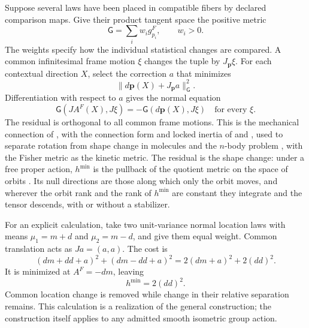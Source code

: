 Suppose several laws have been placed in compatible fibers by declared comparison maps. Give their product tangent space the positive metric
\begin{equation}
\mathsf G=\sum_iw_i g^F_{p_i},
\qquad w_i>0.
\end{equation}
The weights specify how the individual statistical changes are compared. A common infinitesimal frame motion $\xi$ changes the tuple by $J_{\boldsymbol p}\xi$. For each contextual direction $X$, select the correction $a$ that minimizes
\begin{equation}
\|d\boldsymbol p(X)+J_{\boldsymbol p}a\|_{\mathsf G}^2.
\end{equation}
Differentiation with respect to $a$ gives the normal equation
\begin{equation}
\mathsf G(JA^F(X),J\xi)
=-\mathsf G(d\boldsymbol p(X),J\xi)
\quad\text{for every }\xi.
\end{equation}
The residual is orthogonal to all common frame motions. This is the mechanical connection of \citet{Smale1970}, with the connection form and locked inertia of \citet{Kummer1981} and \citet{MarsdenMontgomeryRatiu1990}, used to separate rotation from shape change in molecules \citep{Guichardet1984} and the $n$-body problem \citep{LittlejohnReinsch1997}, with the Fisher metric as the kinetic metric. The residual is the shape change: under a free proper action, $h^{\min}$ is the pullback of the quotient metric on the space of orbits \citep{ONeill1966}. Its null directions are those along which only the orbit moves, and wherever the orbit rank and the rank of $h^{\min}$ are constant they integrate and the tensor descends, with or without a stabilizer.

For an explicit calculation, take two unit-variance normal location laws with means $\mu_1=m+d$ and $\mu_2=m-d$, and give them equal weight. Common translation acts as $J a=(a,a)$. The cost is
\begin{equation}
(dm+dd+a)^2+(dm-dd+a)^2
=2(dm+a)^2+2(dd)^2.
\end{equation}
It is minimized at $A^F=-dm$, leaving
\begin{equation}
h^{\min}=2(dd)^2.
\end{equation}
Common location change is removed while change in their relative separation remains. This calculation is a realization of the general construction; the construction itself applies to any admitted smooth isometric group action.

